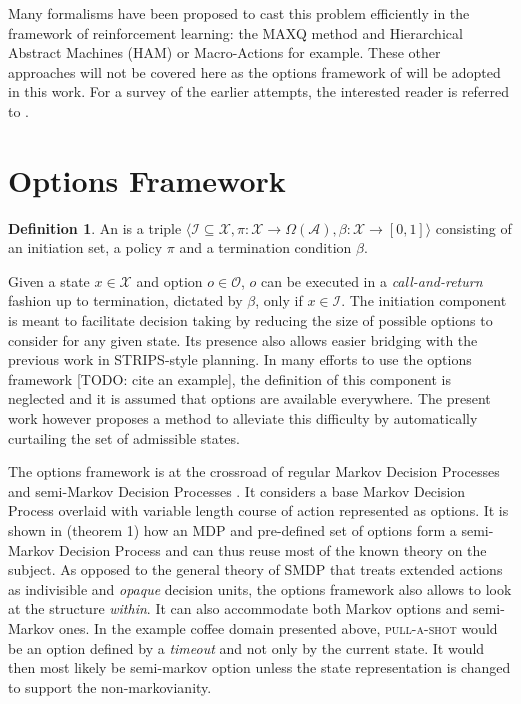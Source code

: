 \documentclass[12pt, oneside, extrafontsizes]{memoir}  %
\newcommand{\mdp}{Markov Decision Process\xspace}
\newcommand{\mdps}{Markov Decision Processes\xspace}
\newcommand{\todo}[1]{[TODO: #1]}
\newcommand{\termidx}[1]{\index{#1}{\textbf{#1}}}
\theoremstyle{plain}
\theoremstyle{definition}
\newtheorem{defn}{Definition}[section]
\begin{document}
Many formalisms have been proposed to cast this problem efficiently in the framework
of reinforcement learning: the MAXQ method \cite{Dietterich1998} and Hierarchical
Abstract Machines (HAM) \cite{Parr1997} or Macro-Actions \cite{Hauskrecht1998} for
example. These other approaches will not be covered here as the options framework of 
\cite{Sutton1999} will be adopted in this work. For a survey of the earlier attempts, the
interested reader is referred to \cite{StolleThesis2004, Sutton1999}.

\section{Options Framework}
\begin{defn}
An \termidx{Option} is a triple $\langle \mathcal{I} \subseteq \mathcal{X},
\mathcal{\pi} : \mathcal{X} \to \Omega(\mathcal{A}), \beta : \mathcal{X} \to [0, 1]
\rangle$ consisting of an initiation set, a policy $\pi$ and a termination condition
$\beta$.
\end{defn}

Given a state $x \in \mathcal{X}$ and option $o \in \mathcal{O}$, $o$ can be
executed in a \textit{call-and-return} fashion up to termination, dictated by $\beta$,
only if $x \in \mathcal{I}$. The initiation component is meant to facilitate decision
taking by reducing the size of possible options to consider for any given state. Its
presence also allows easier bridging with the previous work in STRIPS-style
\cite{Fikes1972} planning. In many efforts to use the options framework \todo{cite an
example}, the definition of this component is neglected and it is assumed that options
are available everywhere. The present work however proposes a method to alleviate
this difficulty by automatically curtailing the set of admissible states.

The options framework is at the crossroad of regular \mdps and semi-\mdps
\cite{Bradtke1994}. It considers a base \mdp overlaid with variable length course of
action represented as options. It is shown in \cite{Sutton1999} (theorem 1) how an
MDP and pre-defined set of options form a semi-\mdp and can thus reuse most of the
known theory on the subject. As opposed to the general theory of SMDP that treats
extended actions as indivisible and \textit{opaque} decision units, the options
framework also allows to look at the structure \textit{within}. It can also accommodate
both Markov options and semi-Markov ones. In the example coffee domain presented
above, \textsc{pull-a-shot} would be an option defined by a \textit{timeout} and not
only by the current state. It would then most likely be semi-markov option unless the
state representation is changed to support the non-markovianity.
\end{document}
